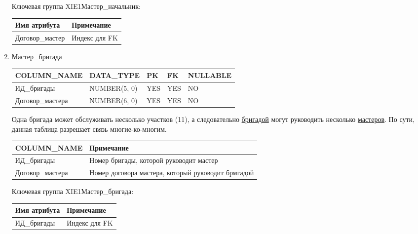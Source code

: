 \begin{enumerate}
\begin{tabular}{|p{4cm}|p{5cm}|}
    \end{tabular}

    Ключевая группа XIE1Мастер\_начальник:

    \begin{tabular}{|p{4cm}|p{5cm}|} \hline

        {\bf Имя атрибута} & {\bf Примечание} \\ \hline
        Договор\_мастер & Индекс для FK \\ \hline

    \end{tabular}

    \item Мастер\_бригада

    \begin{tabular}{|p{4cm}|p{3cm}|p{1cm}|p{1cm}|p{2cm}|} \hline

        {\bf COLUMN\_NAME} & {\bf DATA\_TYPE} & {\bf PK} & {\bf FK} & {\bf NULLABLE} \\ \hline
        ИД\_бригады & NUMBER(5, 0) & YES & YES & NO \\ \hline
        Договор\_мастера & NUMBER(6, 0) & YES & YES & NO \\ \hline

    \end{tabular}

    Одна бригада может обслуживать несколько участков (11), а следовательно \underline{бригадой} могут руководить несколько \underline{мастеров}.
    По сути, данная таблица разрешает связь многие-ко-многим.

    \begin{tabular}{|p{4cm}|p{5cm}|} \hline

        {\bf COLUMN\_NAME} & {\bf Примечание} \\ \hline
        ИД\_бригады & Номер бригады, которой руководит мастер \\ \hline
        Договор\_мастера & Номер договора мастера, который руководит брмгадой \\ \hline

    \end{tabular}

    Ключевая группа XIE1Мастер\_бригада:

    \begin{tabular}{|p{4cm}|p{5cm}|} \hline

        {\bf Имя атрибута} & {\bf Примечание} \\ \hline
        ИД\_бригады & Индекс для FK \\ \hline


\end{tabular}
\end{enumerate}
